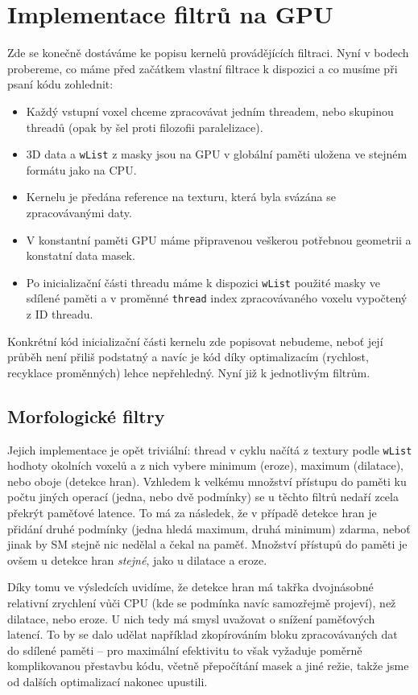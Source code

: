 \section{Implementace filtrů na GPU}

    Zde se konečně dostáváme ke popisu kernelů provádějících filtraci. Nyní v bodech probereme, co máme před začátkem vlastní filtrace k dispozici a co musíme při psaní kódu zohlednit:
    \begin{itemize}
      \item Každý vstupní voxel chceme zpracovávat jedním threadem, nebo skupinou threadů (opak by šel proti filozofii paralelizace).
      \item 3D data a {\tt wList} z masky jsou na GPU v globální paměti uložena ve stejném formátu jako na CPU.
      \item Kernelu je předána reference na texturu, která byla svázána se zpracovávanými daty.
      \item V konstantní paměti GPU máme připravenou veškerou potřebnou geometrii a konstatní data masek.
      \item Po inicializační části threadu máme k dispozici {\tt wList} použité masky ve sdílené paměti a v proměnné {\tt thread} index zpracovávaného voxelu vypočtený z ID threadu.
    \end{itemize}

    Konkrétní kód inicializační části kernelu zde popisovat nebudeme, neboť její průběh není přiliš podstatný a navíc je kód díky optimalizacím (rychlost, recyklace proměnných) lehce nepřehledný. Nyní již k jednotlivým filtrům.

    \subsection{Morfologické filtry}

    Jejich implementace je opět triviální: thread v cyklu načítá z textury podle {\tt wList} hodhoty okolních voxelů a z nich vybere minimum (eroze), maximum (dilatace), nebo oboje (detekce hran). Vzhledem k velkému množství přístupu do paměti ku počtu jiných operací (jedna, nebo dvě podmínky) se u těchto filtrů nedaří zcela překrýt paměťové latence. To má za následek, že v případě detekce hran je přidání druhé podmínky (jedna hledá maximum, druhá minimum) \bq zdarma\eq, neboť jinak by SM stejně nic nedělal a čekal na paměť. Množství přístupů do paměti je ovšem u detekce hran \emph{stejné}, jako u dilatace a eroze.

    Díky tomu ve výsledcích uvidíme, že detekce hran má takřka dvojnásobné relativní zrychlení vůči CPU (kde se podmínka navíc samozřejmě projeví), než dilatace, nebo eroze. U nich tedy má smysl uvažovat o snížení paměťových latencí. To by se dalo udělat například zkopírováním bloku zpracovávaných dat do sdílené paměti -- pro maximální efektivitu to však vyžaduje poměrně komplikovanou přestavbu kódu, včetně přepočítání masek a jiné režie, takže jsme od dalších optimalizací nakonec upustili.

